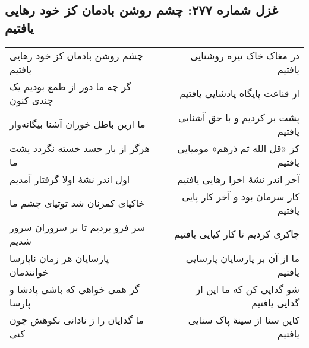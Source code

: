\begin{center}
\section*{غزل شماره ۲۷۷: چشم روشن بادمان کز خود رهایی یافتیم}
\label{sec:277}
\begin{longtable}{l p{0.5cm} r}
چشم روشن بادمان کز خود رهایی یافتیم
&&
در مغاک خاک تیره روشنایی یافتیم
\\
گر چه ما دور از طمع بودیم یک چندی کنون
&&
از قناعت پایگاه پادشایی یافتیم
\\
ما ازین باطل خوران آشنا بیگانه‌وار
&&
پشت بر کردیم و با حق آشنایی یافتیم
\\
هرگز از بار حسد خسته نگردد پشت ما
&&
کز «قل الله ثم ذرهم» مومیایی یافتیم
\\
اول اندر نشهٔ اولا گرفتار آمدیم
&&
آخر اندر نشهٔ اخرا رهایی یافتیم
\\
خاکپای کمزنان شد توتیای چشم ما
&&
کار سرمان بود و آخر کار پایی یافتیم
\\
سر فرو بردیم تا بر سروران سرور شدیم
&&
چاکری کردیم تا کار کیایی یافتیم
\\
پارسایان هر زمان ناپارسا خوانندمان
&&
ما از آن بر پارسایان پارسایی یافتیم
\\
گر همی خواهی که باشی پادشا و پارسا
&&
شو گدایی کن که ما این از گدایی یافتیم
\\
ما گدایان را ز نادانی نکوهش چون کنی
&&
کاین سنا از سینهٔ پاک سنایی یافتیم
\\
\end{longtable}
\end{center}
